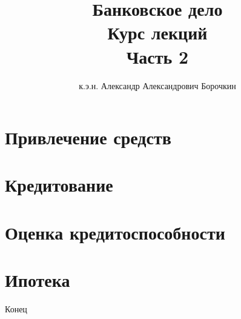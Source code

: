 \documentclass[12pt]{beamer}
\title[Банковское дело]{Банковское дело\\Курс лекций\\Часть 2}
\author{к.э.н. Александр Александрович Борочкин}
\institute{Нижегородский государственный университет}
\date{\the\year}
\begin{document}
\begin{frame}
\titlepage
\end{frame}

\section{Привлечение средств}



\section{Кредитование}


\section{Оценка кредитоспособности}


\section{Ипотека}



\begin{frame}
\begin{center}
\huge{Конец}
\end{center}
\end{frame}
\end{document}
